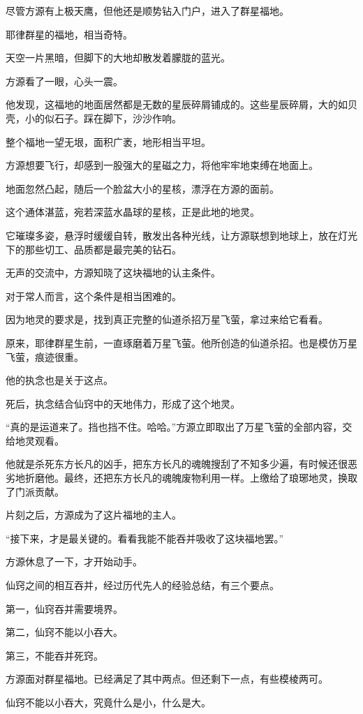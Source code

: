 \begin{this_body}
尽管方源有上极天鹰，但他还是顺势钻入门户，进入了群星福地。

耶律群星的福地，相当奇特。

天空一片黑暗，但脚下的大地却散发着朦胧的蓝光。

方源看了一眼，心头一震。

他发现，这福地的地面居然都是无数的星辰碎屑铺成的。这些星辰碎屑，大的如贝壳，小的似石子。踩在脚下，沙沙作响。

整个福地一望无垠，面积广袤，地形相当平坦。

方源想要飞行，却感到一股强大的星磁之力，将他牢牢地束缚在地面上。

地面忽然凸起，随后一个脸盆大小的星核，漂浮在方源的面前。

这个通体湛蓝，宛若深蓝水晶球的星核，正是此地的地灵。

它璀璨多姿，悬浮时缓缓自转，散发出各种光线，让方源联想到地球上，放在灯光下的那些切工、品质都是最完美的钻石。

无声的交流中，方源知晓了这块福地的认主条件。

对于常人而言，这个条件是相当困难的。

因为地灵的要求是，找到真正完整的仙道杀招万星飞萤，拿过来给它看看。

原来，耶律群星生前，一直琢磨着万星飞萤。他所创造的仙道杀招。也是模仿万星飞萤，痕迹很重。

他的执念也是关于这点。

死后，执念结合仙窍中的天地伟力，形成了这个地灵。

“真的是运道来了。挡也挡不住。哈哈。”方源立即取出了万星飞萤的全部内容，交给地灵观看。

他就是杀死东方长凡的凶手，把东方长凡的魂魄搜刮了不知多少遍，有时候还很恶劣地折磨他。最终，还把东方长凡的魂魄废物利用一样。上缴给了琅琊地灵，换取了门派贡献。

片刻之后，方源成为了这片福地的主人。

“接下来，才是最关键的。看看我能不能吞并吸收了这块福地罢。”

方源休息了一下，才开始动手。

仙窍之间的相互吞并，经过历代先人的经验总结，有三个要点。

第一，仙窍吞并需要境界。

第二，仙窍不能以小吞大。

第三，不能吞并死窍。

方源面对群星福地。已经满足了其中两点。但还剩下一点，有些模棱两可。

仙窍不能以小吞大，究竟什么是小，什么是大。


\end{this_body}
